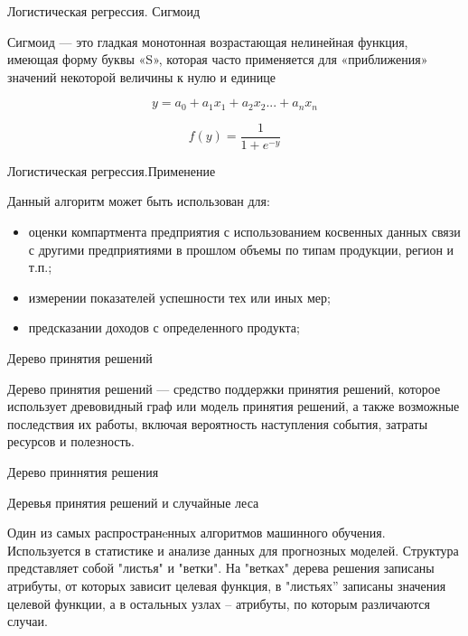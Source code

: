 \documentclass{beamer}
\begin{document}
\begin{frame}{Логистическая регрессия. Сигмоид}

Сигмоид — это гладкая монотонная возрастающая нелинейная функция,
 имеющая форму буквы «S», которая часто применяется для «приближения» 
 значений некоторой величины к нулю и единице


$$  y=a_0 + a_1x_1+ a_2x_2 ...+a_nx_n $$

$$ f(y) = \frac{1}{1 + e^{-y}}$$



\end{frame}



\begin{frame}{Логистическая регрессия.Применение}

Данный алгоритм может быть использован для:
    \begin{itemize}

  \item оценки компартмента предприятия с использованием косвенных данных связи с другими предприятиями в прошлом объемы по типам продукции, регион и т.п.;
  \item измерении показателей успешности  тех или иных мер;
  \item предсказании доходов с определенного продукта;
    \end{itemize}
    

\end{frame}





\begin{frame}{Дерево принятия решений}

Дерево принятия решений — средство поддержки принятия решений, которое использует 
древовидный граф или модель принятия решений, а также возможные последствия их работы, 
включая вероятность наступления события, затраты ресурсов и полезность. 

\end{frame}


\begin{frame}{Дерево приннятия решения}

Деревья принятия решений и случайные леса

Один из самых распространeнных алгоритмов машинного обучения.
 Используется в статистике и анализе данных для прогнозных моделей. 
 Структура представляет собой "листья" и "ветки". 
 На "ветках" дерева решения записаны атрибуты, 
 от которых зависит целевая функция, в "листьях” записаны значения целевой функции, 
 а в остальных узлах – атрибуты, по которым различаются случаи.

\end{frame}
\end{document}
